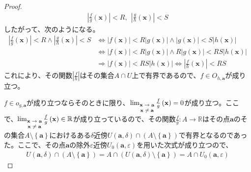 \documentclass[dvipdfmx]{jsarticle}
\begin{document}
\begin{proof}
\begin{align*}
\left| \frac{f}{g}\left( \mathbf{x} \right) \right| < R,\ \ \left| \frac{g}{h}\left( \mathbf{x} \right) \right| < S
\end{align*}
したがって、次のようになる。
\begin{align*}
\left| \frac{f}{g}\left( \mathbf{x} \right) \right| < R \land \left| \frac{g}{h}\left( \mathbf{x} \right) \right| < S &\Leftrightarrow \left| f\left( \mathbf{x} \right) \right| < R\left| g\left( \mathbf{x} \right) \right| \land \left| g\left( \mathbf{x} \right) \right| < S\left| h\left( \mathbf{x} \right) \right|\\
&\Leftrightarrow \left| f\left( \mathbf{x} \right) \right| < R\left| g\left( \mathbf{x} \right) \right| \land R\left| g\left( \mathbf{x} \right) \right| < RS\left| h\left( \mathbf{x} \right) \right|\\
&\Rightarrow \left| f\left( \mathbf{x} \right) \right| < RS\left| h\left( \mathbf{x} \right) \right| \Leftrightarrow \left| \frac{f}{h}\left( \mathbf{x} \right) \right| < RS
\end{align*}
これにより、その関数$\left| \frac{f}{h} \right|$はその集合$A \cap U$上で有界であるので、$f \in O_{h,\mathbf{a}}$が成り立つ。\par
$f \in o_{g,\mathbf{a}}$が成り立つならそのときに限り、$\lim_{\scriptsize \begin{matrix}
\mathbf{x} \rightarrow \mathbf{a} \\
\mathbf{x} \neq \mathbf{a} \\
\end{matrix}}{\frac{f}{g}\left( \mathbf{x} \right)} = 0$が成り立つ。ここで、$\lim_{\scriptsize \begin{matrix}
\mathbf{x} \rightarrow \mathbf{a} \\
\mathbf{x} \neq \mathbf{a} \\
\end{matrix}}{\frac{f}{g}\left( \mathbf{x} \right)} \in \mathbb{R}$が成り立っているので、その関数$\frac{f}{g}:A \rightarrow \mathbb{R}$はその点$\mathbf{a}$のその集合$A \setminus \left\{ \mathbf{a} \right\}$におけるある$\delta$近傍$U\left( \mathbf{a},\delta \right) \cap \left( A \setminus \left\{ \mathbf{a} \right\} \right)$で有界となるのであった。ここで、その点$\mathbf{a}$の除外$\varepsilon$近傍$U_{0}\left( \mathbf{a},\varepsilon \right)$を用いた次式が成り立つので、
\begin{align*}
U\left( \mathbf{a},\delta \right) \cap \left( A \setminus \left\{ \mathbf{a} \right\} \right) = A \cap \left( U\left( \mathbf{a},\delta \right) \setminus \left\{ \mathbf{a} \right\} \right) = A \cap U_{0}\left( \mathbf{a},\varepsilon \right)

\end{align*}
\end{proof}
\end{document}
